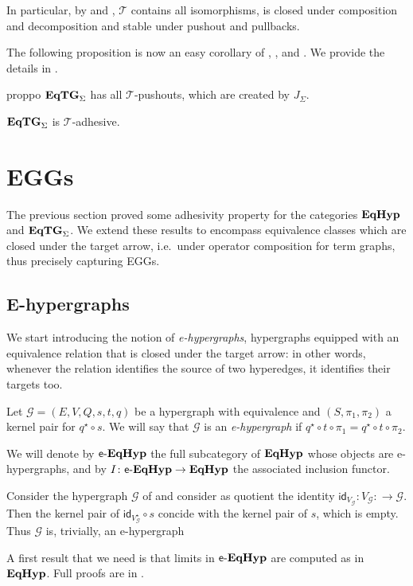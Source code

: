 \documentclass[3p]{elsarticle}
\newcommand{\catname}[1]{\textbf{\textup{#1}}}
\newcommand{\EqHyp}{\catname{EqHyp}} %
\newcommand{\EqTG}{\catname{EqTG}}
\newcommand{\egg}{\mathsf{e}\text{-}\catname{EqHyp}}
\newcommand{\id}[1]{\mathsf{id}_{#1}}
\theoremstyle{remark}
\theoremstyle{definition}
\begin{document}
In particular, by  and , $\mathcal{T}$ contains all isomorphisms, is closed under composition and decomposition and stable under pushout and pullbacks.

The following proposition is now an easy corollary of , , and . We provide the details in .


\begin{restatable}{prop}{po}\label{prop:po}
$\EqTG_{\Sigma}$ has all $\mathcal{T}$-pushouts, which are created by $J_{\Sigma}$.
\end{restatable}

\begin{cor}\label{cor:tade}
	$\EqTG_{\Sigma}$ is $\mathcal{T}$-adhesive.
\end{cor}

\section{EGGs}
\label{eggs}
The previous section proved some adhesivity property for the categories $\EqHyp$ and $\EqTG_{\Sigma}$. We extend these results to
encompass equivalence classes which are closed under the target arrow, i.e.~under operator composition for term graphs, thus precisely capturing EGGs.

\subsection{E-hypergraphs}

We start introducing the notion of \emph{e-hypergraphs}, hypergraphs equipped with an equivalence relation that is closed under the target arrow:
in other words, whenever the relation identifies the source of two hyperedges, it identifies their targets too.

\begin{defi}
	Let $\mathcal{G} = (E, V, Q, s, t, q)$ be a hypergraph with equivalence and $(S, \pi_1, \pi_2)$ a kernel pair for $q^\star \circ s$.
	We will say that $\mathcal{G}$ is an \emph{e-hypergraph} if $q^\star \circ t \circ \pi_1 = q^\star \circ t \circ \pi_2$.
	
	We will denote by $\egg$ the full subcategory of $\EqHyp$ whose objects are e-hypergraphs, and by $I\colon \egg \to \EqHyp$ the associated inclusion functor.
\end{defi}


\begin{exa}
	Consider the hypergraph $\mathcal{G}$ of  and consider as quotient the identity $\id{V_\mathcal{G}}\colon V_\mathcal{G}\colon \to\mathcal{G}$. Then the kernel pair of $\id{V^\star_\mathcal{G}} \circ s$ concide with the kernel pair of $s$, which is empty. Thus  $\mathcal{G}$ is, trivially, an e-hypergraph
\end{exa}
A first result that we need is that limits in $\egg$ are computed as in $\EqHyp$. Full proofs are in .
\end{document}
